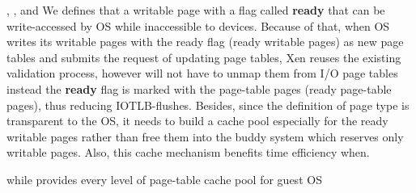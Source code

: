 , , and  We defines that a writable page with a flag called \textbf{ready} that can be write-accessed by OS while inaccessible to devices. Because of that, when OS writes its writable pages with the ready flag (ready writable pages) as new page tables and submits the request of updating page tables, Xen reuses the existing validation process, however will not have to unmap them from I/O page tables instead the \textbf{ready} flag is marked with the page-table pages (ready page-table pages), thus reducing IOTLB-flushes. Besides, since the definition of page type is transparent to the OS, it needs to build a cache pool especially for the ready writable pages rather than free them into the buddy system which reserves only writable pages. Also, this cache mechanism benefits time efficiency when.

while provides every level of page-table cache pool for guest OS
